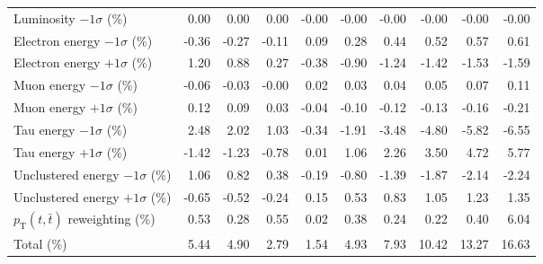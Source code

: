 \begin{table}[htbp]
{\begin{tabular}{lrrrrrrrrr}
Luminosity $-1\sigma$ (\%) & 0.00 & 0.00 & 0.00 & -0.00 & -0.00 & -0.00 & -0.00 & -0.00 & -0.00 \\ 
Electron energy $-1\sigma$ (\%) & -0.36 & -0.27 & -0.11 & 0.09 & 0.28 & 0.44 & 0.52 & 0.57 & 0.61 \\ 
Electron energy $+1\sigma$ (\%) & 1.20 & 0.88 & 0.27 & -0.38 & -0.90 & -1.24 & -1.42 & -1.53 & -1.59 \\ 
Muon energy $-1\sigma$ (\%) & -0.06 & -0.03 & -0.00 & 0.02 & 0.03 & 0.04 & 0.05 & 0.07 & 0.11 \\ 
Muon energy $+1\sigma$ (\%) & 0.12 & 0.09 & 0.03 & -0.04 & -0.10 & -0.12 & -0.13 & -0.16 & -0.21 \\ 
Tau energy $-1\sigma$ (\%) & 2.48 & 2.02 & 1.03 & -0.34 & -1.91 & -3.48 & -4.80 & -5.82 & -6.55 \\ 
Tau energy $+1\sigma$ (\%) & -1.42 & -1.23 & -0.78 & 0.01 & 1.06 & 2.26 & 3.50 & 4.72 & 5.77 \\ 
Unclustered energy $-1\sigma$ (\%) & 1.06 & 0.82 & 0.38 & -0.19 & -0.80 & -1.39 & -1.87 & -2.14 & -2.24 \\ 
Unclustered energy $+1\sigma$ (\%) & -0.65 & -0.52 & -0.24 & 0.15 & 0.53 & 0.83 & 1.05 & 1.23 & 1.35 \\ 
$p_\mathrm{T}(t,\bar{t})$ reweighting (\%) & 0.53 & 0.28 & 0.55 & 0.02 & 0.38 & 0.24 & 0.22 & 0.40 & 6.04 \\ 
\hline 
Total (\%) & 5.44  & 4.90  & 2.79  & 1.54  & 4.93  & 7.93  & 10.42  & 13.27  & 16.63 \\ 
\hline 
\end{tabular}
}
\end{table}
